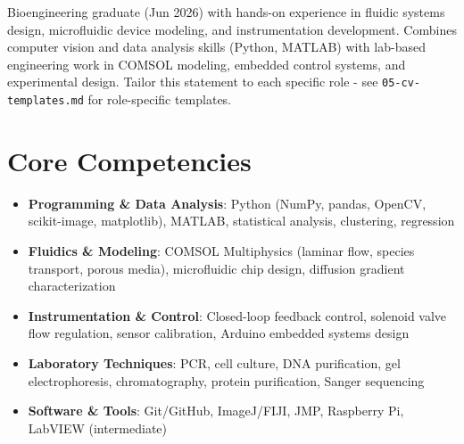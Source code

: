 \documentclass[11pt,a4paper,sans]{moderncv}
\begin{document}
\makecvtitle


\vspace{6pt}
\small{Bioengineering graduate (Jun 2026) with hands-on experience in fluidic systems design, microfluidic device modeling, and instrumentation development. Combines computer vision and data analysis skills (Python, MATLAB) with lab-based engineering work in COMSOL modeling, embedded control systems, and experimental design. Tailor this statement to each specific role - see \texttt{05-cv-templates.md} for role-specific templates.}


\section{Core Competencies}
\vspace{1pt}
\begin{itemize}

\item \textbf{Programming \& Data Analysis}: Python (NumPy, pandas, OpenCV, scikit-image, matplotlib), MATLAB, statistical analysis, clustering, regression

\item \textbf{Fluidics \& Modeling}: COMSOL Multiphysics (laminar flow, species transport, porous media), microfluidic chip design, diffusion gradient characterization

\item \textbf{Instrumentation \& Control}: Closed-loop feedback control, solenoid valve flow regulation, sensor calibration, Arduino embedded systems design

\item \textbf{Laboratory Techniques}: PCR, cell culture, DNA purification, gel electrophoresis, chromatography, protein purification, Sanger sequencing

\item \textbf{Software \& Tools}: Git/GitHub, ImageJ/FIJI, JMP, Raspberry Pi, LabVIEW (intermediate)

\end{itemize}

\end{document}
